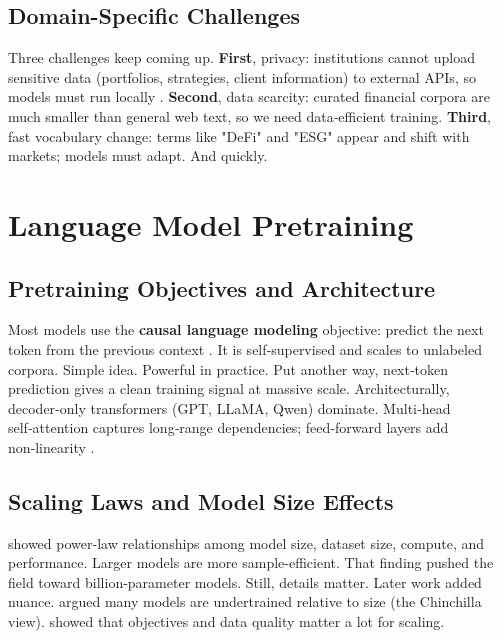 \subsection{Domain-Specific Challenges}

Three challenges keep coming up. \textbf{First}, privacy: institutions cannot upload sensitive data (portfolios, strategies, client information) to external APIs, so models must run locally \parencite{wu2023bloomberggpt}. \textbf{Second}, data scarcity: curated financial corpora are much smaller than general web text, so we need data‑efficient training. \textbf{Third}, fast vocabulary change: terms like "DeFi" and "ESG" appear and shift with markets; models must adapt. And quickly.

\section{Language Model Pretraining}

\subsection{Pretraining Objectives and Architecture}

Most models use the \textbf{causal language modeling} objective: predict the next token from the previous context \parencite{radford2019language, brown2020language}. It is self‑supervised and scales to unlabeled corpora. Simple idea. Powerful in practice. Put another way, next‑token prediction gives a clean training signal at massive scale. Architecturally, decoder‑only transformers (GPT, LLaMA, Qwen) dominate. Multi‑head self‑attention captures long‑range dependencies; feed‑forward layers add non‑linearity \parencite{vaswani2017attention, touvron2023llama}.

\subsection{Scaling Laws and Model Size Effects}

\textcite{kaplan2020scaling} showed power-law relationships among model size, dataset size, compute, and performance. Larger models are more sample-efficient. That finding pushed the field toward billion-parameter models. Still, details matter. Later work added nuance. \textcite{hoffmann2022training} argued many models are undertrained relative to size (the Chinchilla view). \textcite{tay2022ul2} showed that objectives and data quality matter a lot for scaling.

